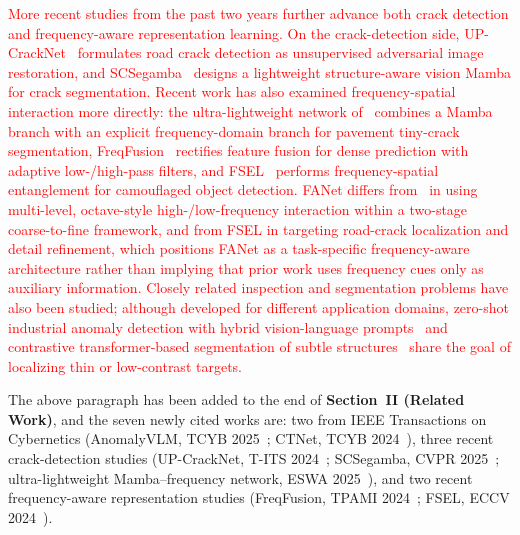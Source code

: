 \documentclass[letterpaper,journal,onecolumn,12pt]{IEEEtran}
\begin{document}
\textcolor{red}{
More recent studies from the past two years further advance both crack detection and frequency-aware representation learning. On the crack-detection side, UP-CrackNet~\cite{TITS24_UPCrackNet} formulates road crack detection as unsupervised adversarial image restoration, and SCSegamba~\cite{CVPR25_SCSegamba} designs a lightweight structure-aware vision Mamba for crack segmentation. Recent work has also examined frequency-spatial interaction more directly: the ultra-lightweight network of~\cite{ESWA25_MambaFreqCrack} combines a Mamba branch with an explicit frequency-domain branch for pavement tiny-crack segmentation, FreqFusion~\cite{TPAMI24_FreqFusion} rectifies feature fusion for dense prediction with adaptive low-/high-pass filters, and FSEL~\cite{ECCV24_FSEL} performs frequency-spatial entanglement for camouflaged object detection. FANet differs from~\cite{ESWA25_MambaFreqCrack} in using multi-level, octave-style high-/low-frequency interaction within a two-stage coarse-to-fine framework, and from FSEL in targeting road-crack localization and detail refinement, which positions FANet as a task-specific frequency-aware architecture rather than implying that prior work uses frequency cues only as auxiliary information. Closely related inspection and segmentation problems have also been studied; although developed for different application domains, zero-shot industrial anomaly detection with hybrid vision-language prompts~\cite{TCYB25_AnomalyVLM} and contrastive transformer-based segmentation of subtle structures~\cite{TCYB24_CTNet} share the goal of localizing thin or low-contrast targets.
}

The above paragraph has been added to the end of \textbf{Section~II (Related Work)}, and the seven newly cited
works are: two from IEEE Transactions on Cybernetics
(AnomalyVLM, TCYB 2025~\cite{TCYB25_AnomalyVLM}; CTNet, TCYB 2024~\cite{TCYB24_CTNet}),
three recent crack-detection studies
(UP-CrackNet, T-ITS 2024~\cite{TITS24_UPCrackNet}; SCSegamba, CVPR 2025~\cite{CVPR25_SCSegamba};
ultra-lightweight Mamba--frequency network, ESWA 2025~\cite{ESWA25_MambaFreqCrack}),
and two recent frequency-aware representation studies
(FreqFusion, TPAMI 2024~\cite{TPAMI24_FreqFusion}; FSEL, ECCV 2024~\cite{ECCV24_FSEL}).\\[10pt]
\end{document}
